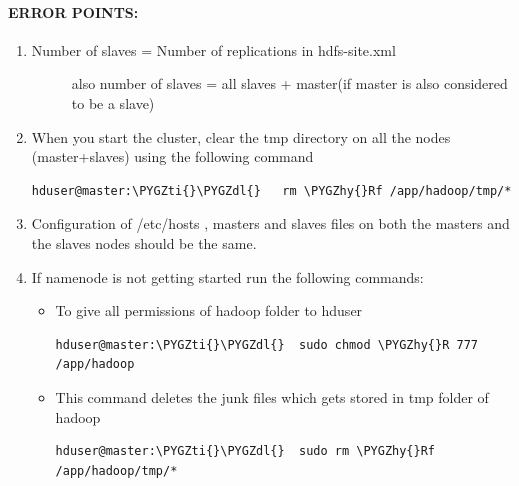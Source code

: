 \documentclass[letterpaper,10pt,english]{sphinxmanual}
\def\PYGZdl{\char`\$}
\def\PYGZhy{\char`\-}
\def\PYGZti{\char`\~}
\begin{document}
\paragraph{ERROR POINTS:}
\label{hadoop:id10}\begin{enumerate}
\item {} \begin{description}
\item[{Number of slaves = Number of replications in hdfs-site.xml}] \leavevmode
also number of slaves = all slaves + master(if master is also considered to be a slave)

\end{description}

\item {} 
When you start the cluster, clear the tmp directory on all the nodes (master+slaves) using the following command

\begin{Verbatim}[commandchars=\\\{\}]
hduser@master:\PYGZti{}\PYGZdl{}   rm \PYGZhy{}Rf /app/hadoop/tmp/*
\end{Verbatim}

\item {} 
Configuration of /etc/hosts , masters  and slaves files on both the masters and the slaves nodes should be the same.

\item {} 
If namenode is not getting started run the following commands:
\begin{itemize}
\item {} 
To give all permissions  of hadoop folder to hduser

\begin{Verbatim}[commandchars=\\\{\}]
hduser@master:\PYGZti{}\PYGZdl{}  sudo chmod \PYGZhy{}R 777 /app/hadoop
\end{Verbatim}

\item {} 
This command deletes the junk files which gets stored in tmp folder of hadoop

\begin{Verbatim}[commandchars=\\\{\}]
hduser@master:\PYGZti{}\PYGZdl{}  sudo rm \PYGZhy{}Rf /app/hadoop/tmp/*
\end{Verbatim}

\end{itemize}

\end{enumerate}
\end{document}
